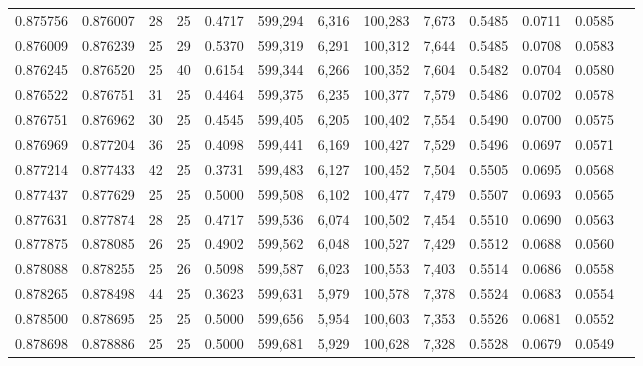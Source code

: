 \begin{tabular}{rrrrrrrrrrrrr}
0.875756 & 0.876007 &    28 &  25 &                                     0.4717 & 599,294 &   6,316 & 100,283 &   7,673 & 0.5485 & 0.0711 & 0.0585 \\
0.876009 & 0.876239 &    25 &  29 &                                     0.5370 & 599,319 &   6,291 & 100,312 &   7,644 & 0.5485 & 0.0708 & 0.0583 \\
0.876245 & 0.876520 &    25 &  40 &                                     0.6154 & 599,344 &   6,266 & 100,352 &   7,604 & 0.5482 & 0.0704 & 0.0580 \\
0.876522 & 0.876751 &    31 &  25 &                                     0.4464 & 599,375 &   6,235 & 100,377 &   7,579 & 0.5486 & 0.0702 & 0.0578 \\
0.876751 & 0.876962 &    30 &  25 &                                     0.4545 & 599,405 &   6,205 & 100,402 &   7,554 & 0.5490 & 0.0700 & 0.0575 \\
0.876969 & 0.877204 &    36 &  25 &                                     0.4098 & 599,441 &   6,169 & 100,427 &   7,529 & 0.5496 & 0.0697 & 0.0571 \\
0.877214 & 0.877433 &    42 &  25 &                                     0.3731 & 599,483 &   6,127 & 100,452 &   7,504 & 0.5505 & 0.0695 & 0.0568 \\
0.877437 & 0.877629 &    25 &  25 &                                     0.5000 & 599,508 &   6,102 & 100,477 &   7,479 & 0.5507 & 0.0693 & 0.0565 \\
0.877631 & 0.877874 &    28 &  25 &                                     0.4717 & 599,536 &   6,074 & 100,502 &   7,454 & 0.5510 & 0.0690 & 0.0563 \\
0.877875 & 0.878085 &    26 &  25 &                                     0.4902 & 599,562 &   6,048 & 100,527 &   7,429 & 0.5512 & 0.0688 & 0.0560 \\
0.878088 & 0.878255 &    25 &  26 &                                     0.5098 & 599,587 &   6,023 & 100,553 &   7,403 & 0.5514 & 0.0686 & 0.0558 \\
0.878265 & 0.878498 &    44 &  25 &                                     0.3623 & 599,631 &   5,979 & 100,578 &   7,378 & 0.5524 & 0.0683 & 0.0554 \\
0.878500 & 0.878695 &    25 &  25 &                                     0.5000 & 599,656 &   5,954 & 100,603 &   7,353 & 0.5526 & 0.0681 & 0.0552 \\
0.878698 & 0.878886 &    25 &  25 &                                     0.5000 & 599,681 &   5,929 & 100,628 &   7,328 & 0.5528 & 0.0679 & 0.0549 \\

\end{tabular}
